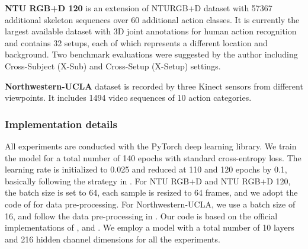 \documentclass[10pt,twocolumn,letterpaper]{article}
\begin{document}
\noindent
\textbf{NTU RGB+D 120} \cite{liu2019ntu} is an extension of NTURGB+D dataset with 57367 additional skeleton sequences over 60 additional action classes.
It is currently the largest available dataset with 3D joint annotations for human action recognition and contains 32 setups, each of which represents a different location and background. Two benchmark evaluations were suggested by the author including Cross-Subject (X-Sub) and Cross-Setup (X-Setup) settings. 



\noindent
\textbf{Northwestern-UCLA} \cite{wang2014cross} dataset is
recorded by three Kinect sensors from different viewpoints. It includes 1494 video sequences of 10 action categories. 




\subsubsection{Implementation details}
\label{implement}
All experiments are conducted with the PyTorch \cite{paszke2019pytorch} deep learning library.
We train the model for a total number of 140 epochs with standard cross-entropy loss.
The learning rate is initialized to 0.025 and reduced at 110 and 120 epochs by 0.1, basically following the strategy in \cite{chi2022infogcn}.
For NTU RGB+D and NTU RGB+D 120, the batch size is set to 64, each sample is resized to 64 frames, and we adopt the code of \cite{zhang2020semantics} for data pre-processing.
For Northwestern-UCLA, we use a batch size of 16, and
follow the data pre-processing in \cite{cheng2020skeleton,chen2021channel}.
Our code is based on the official implementations of \cite{touvron2021training}, \cite{chen2021channel} and \cite{zhang2020semantics}. We employ a model with a total number of 10 layers and 216 hidden channel dimensions for all the experiments.
\end{document}
